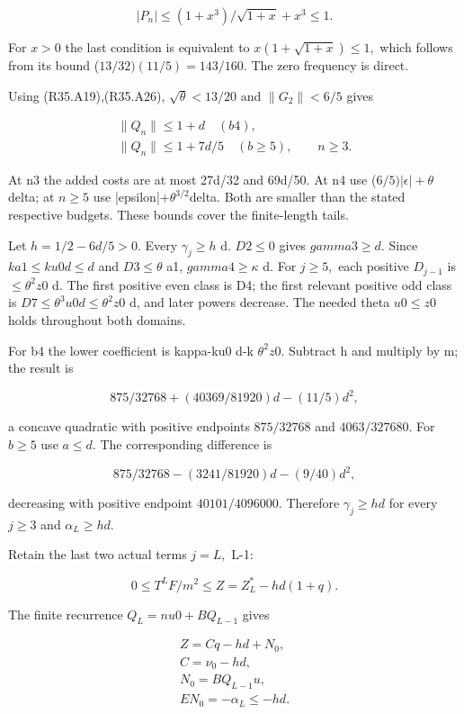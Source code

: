 \[
|P_n|\le(1+x^3)/\sqrt{1+x}+x^3\le1.
\]

For \(x>0\) the last condition is equivalent to \(x(1+\sqrt{1+x})\le 1,\allowbreak \) which follows from its bound (\(13/32)(11/5)=143/160.\) The zero frequency is direct.

Using (R35.A19),(R35.A26), \(\sqrt{\theta}<13/20\) and \(\lVert G_{2}\rVert <6/5\) gives

\[
\begin{gathered}
\|Q_n\|\le1+d\quad(b4),\qquad\\
\|Q_n\|\le1+7d/5\quad(b\ge5),\qquad n\ge3.
\end{gathered}\tag{R35.A37}
\]

At n3 the added costs are at most 27d/32 and 69d/50. At n4 use (\(6/5)|\epsilon|+\theta\) delta; at \(n\ge 5\) use |epsilon|+\(\theta^{3/2}\)delta. Both are smaller than the stated respective budgets. These bounds cover the finite-length tails.

Let \(h=1/2-6d/5>0.\) Every \(\gamma_j\ge h\) d.
\(D2\le 0\) gives \(gamma3\ge d.\) Since \(ka1\le ku0 d\le d\) and \(D3\le \theta\) a1, \(gamma4\ge \kappa\) d.
For \(j\ge 5,\allowbreak \) each positive \(D_{j-1}\) is \ensuremath{\le}\(\theta^2z0\) d. The first positive even class is D4; the first relevant positive odd class is \(D7\le \theta^3u0 d\le \theta^2z0\) d, and later powers decrease. The needed theta \(u0\le z0\) holds throughout both domains.

For b4 the lower coefficient is kappa-ku0 d-k \(\theta^2z0.\) Subtract h and multiply by m; the result is

\[
875/32768+(40369/81920)d-(11/5)d^2,
\]

a concave quadratic with positive endpoints \(875/32768\) and \(4063/327680.\)
For \(b\ge 5\) use \(a\le d.\) The corresponding difference is

\[
875/32768-(3241/81920)d-(9/40)d^2,
\]

decreasing with positive endpoint \(40101/4096000.\) Therefore \(\gamma_j\ge hd\) for every \(j\ge 3\) and \(\alpha_L\ge hd.\)

Retain the last two actual terms \(j=L,\allowbreak \) L-1:

\[
0\le T^LF/m^2\le Z=Z_L^*-hd(1+q).
\]

The finite recurrence \(Q_L=nu0+ BQ_{L-1}\) gives

\[
\begin{gathered}
Z=Cq-hd+N_0,\\
C=\nu_0-hd,\\
N_0=BQ_{L-1}u,\\
EN_0=-\alpha_L\le-hd.
\end{gathered}\tag{R35.A38}
\]

